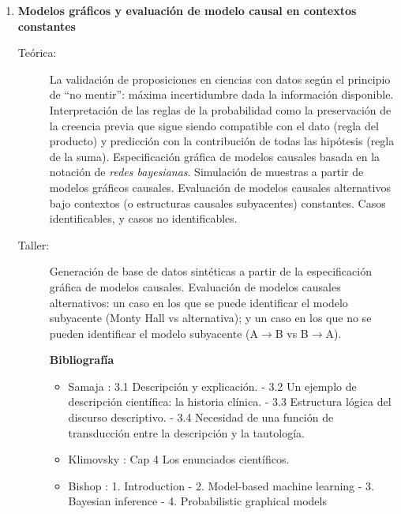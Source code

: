 \documentclass[11pt]{article}
\begin{document}
\begin{enumerate}

\item \textbf{Modelos gráficos y evaluación de modelo causal en contextos constantes}
\vspace{-0.15cm}
\begin{description}
\item[Teórica:] La validación de proposiciones en ciencias con datos según el principio de ``no mentir'': máxima incertidumbre dada la información disponible.
Interpretación de las reglas de la probabilidad como la preservación de la creencia previa que sigue siendo compatible con el dato (regla del producto) y predicción con la contribución de todas las hipótesis (regla de la suma). Especificación gráfica de modelos causales basada en la notación de \emph{redes bayesianas}. Simulación de muestras a partir de modelos gráficos causales. Evaluación de modelos causales alternativos bajo contextos (o estructuras causales subyacentes) constantes. Casos identificables, y casos no identificables.
\item[Taller:] Generación de base de datos sintéticas a partir de la especificación gráfica de modelos causales.
Evaluación de modelos causales alternativos: un caso en los que se puede identificar el modelo subyacente (Monty Hall vs alternativa); y un caso en los que no se pueden identificar el modelo subyacente (A$\rightarrow$B vs B$\rightarrow$A).
\item[] \textbf{Bibliografía}
\begin{itemize}
\item Samaja \cite{samaja1999-epistemologiaMetodologia}: 3.1 Descripción y explicación. - 3.2 Un ejemplo de descripción científica: la historia clínica. - 3.3 Estructura lógica del discurso descriptivo. - 3.4 Necesidad de una función de transducción entre la descripción y la tautología.
\item Klimovsky \cite{klimovsky1994-desventuras}: Cap 4 Los enunciados científicos.
\item Bishop \cite{bishop2013-mbmlpaper}: 1. Introduction - 2. Model-based machine learning - 3. Bayesian inference - 4. Probabilistic graphical models
\end{itemize}
\end{description}


\end{enumerate}
\end{document}
